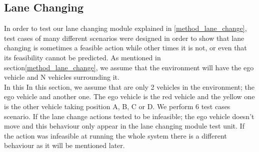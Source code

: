 \subsection{Lane Changing}
\label{test_lane_change}
In order to test our lane changing module explained in \ref{method_lane_change}, test cases of many different scenarios were designed in order to show that lane changing is sometimes a feasible action while other times it is not, or even that its feasibility cannot be predicted. As mentioned in section\ref{method_lane_change}, we assume that the environment will have the ego vehicle and N vehicles surrounding it. \\
In this In this section, we assume that are only 2 vehicles in the environment; the ego vehicle and another one. The ego vehicle is the red vehicle and the yellow one is the other vehicle taking position A, B, C or D.
 We perform 6 test cases scenario. If the lane change actions tested to be infeasible; the ego vehicle doesn't move and this behaviour only appear in the lane changing module test unit. If the action was infeasible at running the whole system there is a different behaviour as it will be mentioned later.

